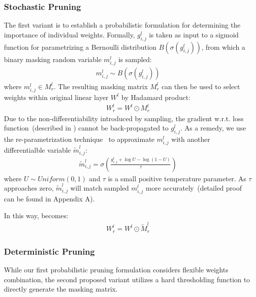 \subsubsection{Stochastic Pruning}
\label{sec:stochastic}
The first variant is to establish a probabilistic formulation for determining the importance of individual weights. Formally, $g_{i,j}^l$ is taken as input to a sigmoid function for parametrizing a Bernoulli distribution $B(\sigma(g_{i,j}^l))$, from which a binary masking random variable $m_{i,j}^l$ is sampled:
\begin{align}
	m_{i,j}^l\sim B(\sigma(g_{i,j}^l))
	\label{eq:bernoulli}
\end{align}
where $m_{i,j}^l\in M_r^l$. The resulting masking matrix $M_{r}^{l}$ 
can then be used to select weights within original linear layer $W^l$ 
by Hadamard product:
\begin{align}
	W_r^l = W^l \odot M_r^l
	\label{eq:mask}
\end{align}
Due to the non-differentiability introduced by sampling, the gradient w.r.t. loss function~(described in ) cannot be back-propagated to $g_{i,j}^l$. As a remedy, we use the re-parametrization 
technique~\citep{Li2018} to approximate $m_{i,j}^l$ with another 
differentialble variable $\tilde{m}_{i,j}^l$:
\begin{align}
	\tilde{m}_{i,j}^l=\sigma(\frac{g_{i,j}^l+\log{U}-\log{(1-U)}}{\tau})
\end{align}
where $U\sim Uniform(0,1)$ and $\tau$ is a small positive temperature parameter. As $\tau$ approaches zero, $\tilde{m}_{i,j}^l$ will match sampled $m_{i,j}^l$ more accurately~(detailed proof can be found in Appendix A). 

In this way,  becomes:
\begin{align}
	W_r^l = W^l \odot \tilde{M}_r^l
	\label{eq:soft}
\end{align}
\subsubsection{Deterministic Pruning}
\label{sec:deterministic}
While our first probabilistic pruning formulation considers flexible weights combination, the second proposed variant utilizes a hard thresholding function to directly generate the masking matrix.

